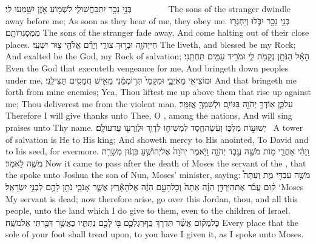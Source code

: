 {בְּנֵ֥י נֵכָ֖ר יִתְכַּחֲשׁוּ\maqqaf לִ֑י לִשְׁמ֥וֹעַ אֹ֖זֶן יִשָּׁ֥מְעוּ לִֽי׃        }
{The sons of the stranger dwindle away before me; As soon as they hear of me, they obey me.}
{בְּנֵ֥י נֵכָ֖ר יִבֹּ֑לוּ וְיַחְגְּר֖וּ מִמִּסְגְּרוֹתָֽם׃}
{The sons of the stranger fade away, And come halting out of their close places.}
{חַי\maqqaf יְהֹוָ֖ה וּבָר֣וּךְ צוּרִ֑י וְיָרֻ֕ם אֱלֹהֵ֖י צ֥וּר יִשְׁעִֽי׃}
{The \lord\space liveth, and blessed be my Rock; And exalted be the God, my Rock of salvation;}
{הָאֵ֕ל הַנֹּתֵ֥ן נְקָמֹ֖ת לִ֑י וּמֹרִ֥יד עַמִּ֖ים תַּחְתֵּֽנִי׃}
{Even the God that executeth vengeance for me, And bringeth down peoples under me,}
{וּמוֹצִיאִ֖י מֵאֹֽיְבָ֑י וּמִקָּמַי֙ תְּר֣וֹמְמֵ֔נִי מֵאִ֥ישׁ חֲמָסִ֖ים תַּצִּילֵֽנִי׃}
{And that bringeth me forth from mine enemies; Yea, Thou liftest me up above them that rise up against me; Thou deliverest me from the violent man.}
{עַל\maqqaf כֵּ֛ן אֽוֹדְךָ֥ יְהֹוָ֖ה בַּגּוֹיִ֑ם וּלְשִׁמְךָ֖ אֲזַמֵּֽר׃}
{Therefore I will give thanks unto Thee, O \lord, among the nations, And will sing praises unto Thy name.}
{ יְשׁוּע֣וֹת מַלְכּ֑וֹ וְעֹֽשֶׂה\maqqaf חֶ֧סֶד לִמְשִׁיח֛וֹ לְדָוִ֥ד וּלְזַרְע֖וֹ עַד\maqqaf עוֹלָֽם׃ \petucha }
{A tower of salvation is He to His king; And showeth mercy to His anointed, To David and to his seed, for evermore.}
\label{haft_54}
\setcounter{chap}{1}
\setcounter{verse}{1}
{וַֽיְהִ֗י אַחֲרֵ֛י מ֥וֹת מֹשֶׁ֖ה עֶ֣בֶד יְהֹוָ֑ה וַיֹּ֤אמֶר יְהֹוָה֙ אֶל\maqqaf יְהוֹשֻׁ֣עַ בִּן\maqqaf נ֔וּן מְשָׁרֵ֥ת מֹשֶׁ֖ה לֵאמֹֽר׃}
{Now it came to pass after the death of Moses the servant of the \lord, that the \lord\space spoke unto Joshua the son of Nun, Moses’ minister, saying:}
{מֹשֶׁ֥ה עַבְדִּ֖י מֵ֑ת וְעַתָּה֩ ק֨וּם עֲבֹ֜ר אֶת\maqqaf הַיַּרְדֵּ֣ן הַזֶּ֗ה אַתָּה֙ וְכׇל\maqqaf הָעָ֣ם הַזֶּ֔ה אֶל\maqqaf הָאָ֕רֶץ אֲשֶׁ֧ר אָנֹכִ֛י נֹתֵ֥ן לָהֶ֖ם לִבְנֵ֥י יִשְׂרָאֵֽל׃}
{‘Moses My servant is dead; now therefore arise, go over this Jordan, thou, and all this people, unto the land which I do give to them, even to the children of Israel.}
{כׇּל\maqqaf מָק֗וֹם אֲשֶׁ֨ר תִּדְרֹ֧ךְ כַּֽף\maqqaf רַגְלְכֶ֛ם בּ֖וֹ לָכֶ֣ם נְתַתִּ֑יו כַּאֲשֶׁ֥ר דִּבַּ֖רְתִּי אֶל\maqqaf מֹשֶֽׁה׃}
{Every place that the sole of your foot shall tread upon, to you have I given it, as I spoke unto Moses.}
